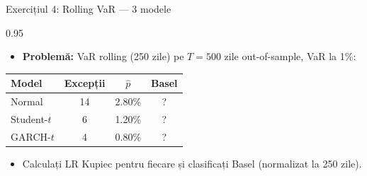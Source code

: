 \documentclass[9pt, aspectratio=169, t]{beamer}
\begin{document}
\begin{frame}{Exercițiul 4: Rolling VaR --- 3 modele}
    \begin{cminipage}{0.95\textwidth}
    \begin{itemize}\setlength{\itemsep}{0pt}
        \item \textbf{Problemă:} VaR rolling (250 zile) pe $T = 500$ zile out-of-sample, VaR la 1\%:
    \end{itemize}

    \renewcommand{\arraystretch}{1.2}
    \begin{center}
    \begin{tabular}{lccc}
    \toprule
    \textbf{Model} & \textbf{Excepții} & $\hat{p}$ & \textbf{Basel} \\
    \midrule
    Normal & 14 & 2.80\% & ? \\
    Student-$t$ & 6 & 1.20\% & ? \\
    GARCH-$t$ & 4 & 0.80\% & ? \\
    \bottomrule
    \end{tabular}
    \end{center}

    \begin{itemize}\setlength{\itemsep}{0pt}
        \item Calculați LR Kupiec pentru fiecare și clasificați Basel (normalizat la 250 zile).
    \end{itemize}
    \end{cminipage}
\end{frame}
\end{document}
